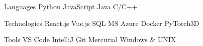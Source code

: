 

\begin{cvskills}

  \cvskill
  {Languages} %
  {
    Python
      {\enskip\cdotp\enskip} JavaScript
      {\enskip\cdotp\enskip} Java
      {\enskip\cdotp\enskip} C/C++
  } %

  \cvskill
  {Technologies} %
  {
    React.js
      {\enskip\cdotp\enskip} Vue.js
      {\enskip\cdotp\enskip} SQL
      {\enskip\cdotp\enskip} MS Azure
      {\enskip\cdotp\enskip} Docker
      {\enskip\cdotp\enskip} PyTorch3D
  } %

  \cvskill
  {Tools} %
  {
    VS Code
      {\enskip\cdotp\enskip} IntelliJ
      {\enskip\cdotp\enskip} Git
      {\enskip\cdotp\enskip} Mercurial
      {\enskip\cdotp\enskip} Windows \& UNIX
  } %


\end{cvskills}
